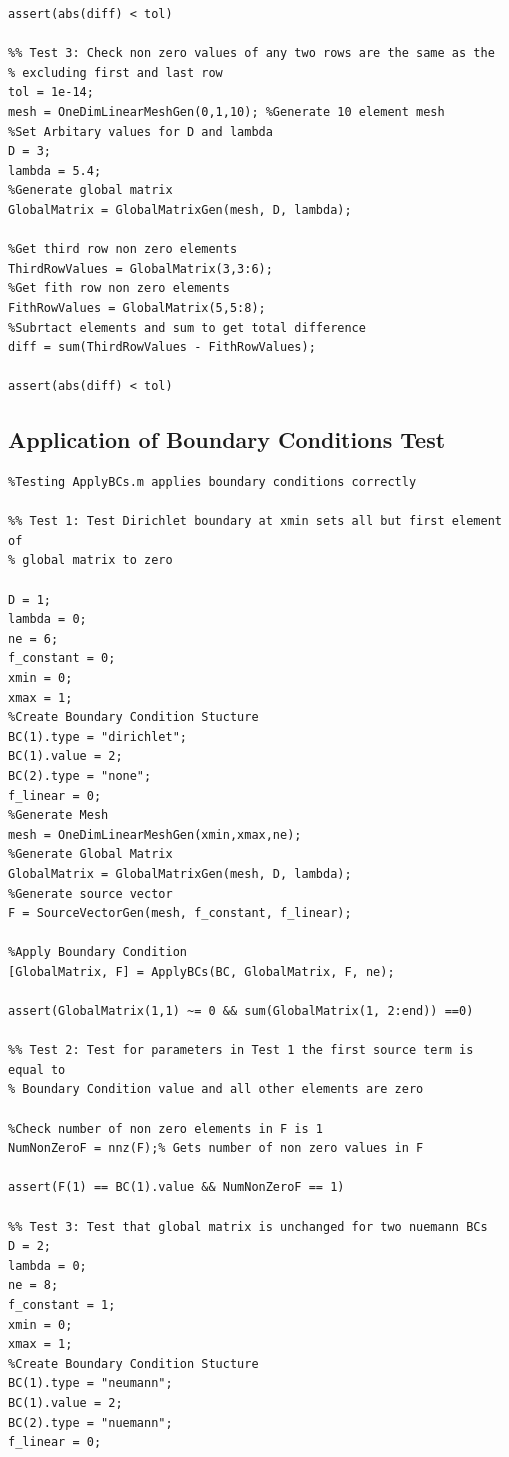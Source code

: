 \documentclass[11pt]{article}
\begin{document}
\begin{appendices}
\begin{lstlisting}
assert(abs(diff) < tol) 

%% Test 3: Check non zero values of any two rows are the same as the 
% excluding first and last row
tol = 1e-14;
mesh = OneDimLinearMeshGen(0,1,10); %Generate 10 element mesh
%Set Arbitary values for D and lambda
D = 3;
lambda = 5.4;
%Generate global matrix
GlobalMatrix = GlobalMatrixGen(mesh, D, lambda);

%Get third row non zero elements
ThirdRowValues = GlobalMatrix(3,3:6);
%Get fith row non zero elements
FithRowValues = GlobalMatrix(5,5:8);
%Subrtact elements and sum to get total difference
diff = sum(ThirdRowValues - FithRowValues);

assert(abs(diff) < tol)
\end{lstlisting}

\subsection{Application of Boundary Conditions Test}
\begin{lstlisting}
%Testing ApplyBCs.m applies boundary conditions correctly

%% Test 1: Test Dirichlet boundary at xmin sets all but first element of 
% global matrix to zero

D = 1;
lambda = 0;
ne = 6;
f_constant = 0;
xmin = 0;
xmax = 1;
%Create Boundary Condition Stucture
BC(1).type = "dirichlet";
BC(1).value = 2;
BC(2).type = "none";
f_linear = 0;
%Generate Mesh
mesh = OneDimLinearMeshGen(xmin,xmax,ne);
%Generate Global Matrix
GlobalMatrix = GlobalMatrixGen(mesh, D, lambda);
%Generate source vector
F = SourceVectorGen(mesh, f_constant, f_linear);

%Apply Boundary Condition
[GlobalMatrix, F] = ApplyBCs(BC, GlobalMatrix, F, ne);

assert(GlobalMatrix(1,1) ~= 0 && sum(GlobalMatrix(1, 2:end)) ==0) 

%% Test 2: Test for parameters in Test 1 the first source term is equal to
% Boundary Condition value and all other elements are zero

%Check number of non zero elements in F is 1
NumNonZeroF = nnz(F);% Gets number of non zero values in F

assert(F(1) == BC(1).value && NumNonZeroF == 1)

%% Test 3: Test that global matrix is unchanged for two nuemann BCs
D = 2;
lambda = 0;
ne = 8;
f_constant = 1;
xmin = 0;
xmax = 1;
%Create Boundary Condition Stucture
BC(1).type = "neumann";
BC(1).value = 2;
BC(2).type = "nuemann";
f_linear = 0;


\end{lstlisting}
\end{appendices}
\end{document}
